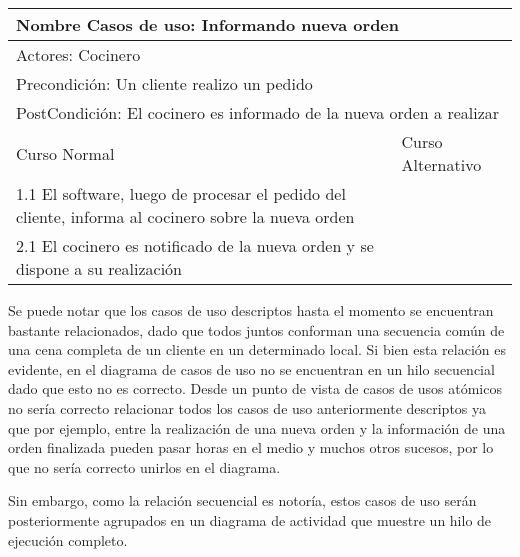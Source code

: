 \documentclass[a4paper,10pt]{article}
\begin{document}
\bigskip

\begin{center}
\begin{tabularx}{14cm}{|X|X|}
\hline
\multicolumn{2}{|l|}{Nombre Casos de uso: Informando nueva orden}\\
\hline
\multicolumn{2}{|l|}{Actores: Cocinero}\\
\hline
\multicolumn{2}{|l|}{Precondici\'on: Un cliente realizo un pedido}\\
\hline
\multicolumn{2}{|l|}{PostCondici\'on: El cocinero es informado de la nueva orden a realizar}\\
\hline
Curso Normal & Curso Alternativo\\
\hline
1.1 El software, luego de procesar el pedido del cliente, informa al cocinero sobre la nueva orden & 
\\
\hline
2.1 El cocinero es notificado de la nueva orden y se dispone a su realizaci\'on & 
\\
\hline
\end{tabularx}
\end{center}


\medskip

Se puede notar que los casos de uso descriptos hasta el momento se encuentran bastante relacionados, dado que todos juntos conforman una secuencia
com\'un de una cena completa de un cliente en un determinado local. Si bien esta relaci\'on es evidente, en el diagrama de casos de uso no se encuentran
en un hilo secuencial dado que esto no es correcto. Desde un punto de vista de casos de usos at\'omicos no ser\'ia correcto relacionar todos los casos de uso
anteriormente descriptos ya que por ejemplo, entre la realizaci\'on de una nueva orden y la informaci\'on de una orden finalizada pueden pasar horas
en el medio y muchos otros sucesos, por lo que no ser\'ia correcto unirlos en el diagrama.


Sin embargo, como la relaci\'on secuencial es notor\'ia, estos casos de uso ser\'an posteriormente agrupados en un diagrama de actividad que muestre
un hilo de ejecuci\'on completo.

\bigskip
\end{document}

